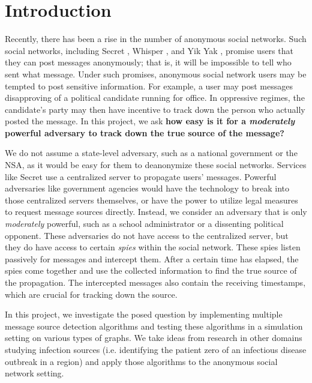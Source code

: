 \section{Introduction}

Recently, there has been a rise in the number of anonymous social networks. Such social networks, including Secret \cite{secret}, Whisper \cite{whisper}, and Yik Yak \cite{yikyak}, promise users that they can post messages anonymously; that is, it will be impossible to tell who sent what message. Under such promises, anonymous social network users may be tempted to post sensitive information. For example, a user may post messages disapproving of a political candidate running for office. In oppressive regimes, the candidate's party may then have incentive to track down the person who actually posted the message. In this project, we ask \textbf{how easy is it for a \emph{moderately} powerful adversary to track down the true source of the message?}

We do not assume a state-level adversary, such as a national government or the NSA, as it would be easy for them to deanonymize these social networks. Services like Secret use a centralized server to propagate users' messages. Powerful adversaries like government agencies would have the technology to break into those centralized servers themselves, or have the power to utilize legal measures to request message sources directly. Instead, we consider an adversary that is only \emph{moderately} powerful, such as a school administrator or a dissenting political opponent. These adversaries do not have access to the centralized server, but they do have access to certain \emph{spies} within the social network. These spies listen passively for messages and intercept them. After a certain time has elapsed, the spies come together and use the collected information to find the true source of the propagation. The intercepted messages also contain the receiving timestamps, which are crucial for tracking down the source.

In this project, we investigate the posed question by implementing multiple message source detection algorithms and testing these algorithms in a simulation setting on various types of graphs. We take ideas from research in other domains studying infection sources (i.e. identifying the patient zero of an infectious disease outbreak in a region) and apply those algorithms to the anonymous social network setting. 



